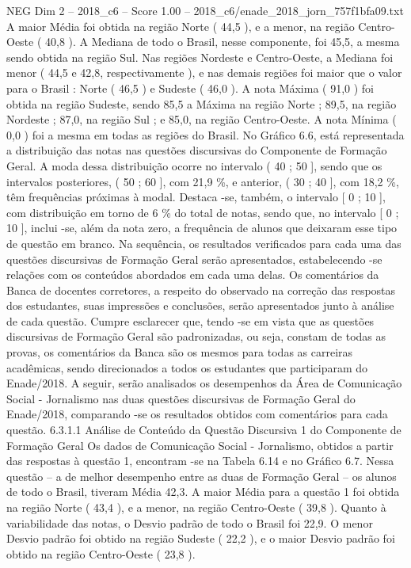 \begin{textsample}{NEG Dim 2 – 2018\_c6 – Score 1.00 – 2018\_c6/enade\_2018\_jorn\_757f1bfa09.txt}
A maior Média foi obtida na região Norte ( 44,5 ), e a menor, na região Centro-Oeste ( 40,8 ).
A Mediana de todo o Brasil, nesse componente, foi 45,5, a mesma sendo obtida na região Sul.
Nas regiões Nordeste e Centro-Oeste, a Mediana foi menor ( 44,5 e 42,8, respectivamente ), e nas demais regiões foi maior que o valor para o Brasil : Norte ( 46,5 ) e Sudeste ( 46,0 ).
A nota Máxima ( 91,0 ) foi obtida na região Sudeste, sendo 85,5 a Máxima na região Norte ; 89,5, na região Nordeste ; 87,0, na região Sul ; e 85,0, na região Centro-Oeste.
A nota Mínima ( 0,0 ) foi a mesma em todas as regiões do Brasil.
No Gráfico 6.6, está representada a distribuição das notas nas questões discursivas do Componente de Formação Geral.
A moda dessa distribuição ocorre no intervalo ( 40 ; 50 ], sendo que os intervalos posteriores, ( 50 ; 60 ], com 21,9 \%, e anterior, ( 30 ; 40 ], com 18,2 \%, têm frequências próximas à modal.
Destaca -se, também, o intervalo [ 0 ; 10 ], com distribuição em torno de 6 \% do total de notas, sendo que, no intervalo [ 0 ; 10 ], inclui -se, além da nota zero, a frequência de alunos que deixaram esse tipo de questão em branco.
Na sequência, os resultados verificados para cada uma das questões discursivas de Formação Geral serão apresentados, estabelecendo -se relações com os conteúdos abordados em cada uma delas.
Os comentários da Banca de docentes corretores, a respeito do observado na correção das respostas dos estudantes, suas impressões e conclusões, serão apresentados junto à análise de cada questão.
Cumpre esclarecer que, tendo -se em vista que as questões discursivas de Formação Geral são padronizadas, ou seja, constam de todas as provas, os comentários da Banca são os mesmos para todas as carreiras acadêmicas, sendo direcionados a todos os estudantes que participaram do Enade/2018.
A seguir, serão analisados os desempenhos da Área de Comunicação Social - Jornalismo nas duas questões discursivas de Formação Geral do Enade/2018, comparando -se os resultados obtidos com comentários para cada questão. 6.3.1.1 Análise de Conteúdo da Questão Discursiva 1 do Componente de Formação Geral Os dados de Comunicação Social - Jornalismo, obtidos a partir das respostas à questão 1, encontram -se na Tabela 6.14 e no Gráfico 6.7.
Nessa questão – a de melhor desempenho entre as duas de Formação Geral – os alunos de todo o Brasil, tiveram Média 42,3.
A maior Média para a questão 1 foi obtida na região Norte ( 43,4 ), e a menor, na região Centro-Oeste ( 39,8 ).
Quanto à variabilidade das notas, o Desvio padrão de todo o Brasil foi 22,9.
O menor Desvio padrão foi obtido na região Sudeste ( 22,2 ), e o maior Desvio padrão foi obtido na região Centro-Oeste ( 23,8 ).

\end{textsample}
